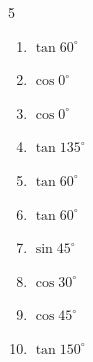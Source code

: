 \begin{multicols}{5}
\begin{enumerate}
  \item $\displaystyle \tan{60^\circ}$


  \item $\displaystyle \cos{0^\circ}$

        \phantom{$\displaystyle =1$}

  \item $\displaystyle \cos{0^\circ}$

        \phantom{$\displaystyle =1$}

  \item $\displaystyle \tan{135^\circ}$

        \phantom{$\displaystyle =-1$}

  \item $\displaystyle \tan{60^\circ}$


  \item $\displaystyle \tan{60^\circ}$


  \item $\displaystyle \sin{45^\circ}$


  \item $\displaystyle \cos{30^\circ}$


  \item $\displaystyle \cos{45^\circ}$


  \item $\displaystyle \tan{150^\circ}$


\end{enumerate}
\end{multicols}

\newpage
\resetdrill

